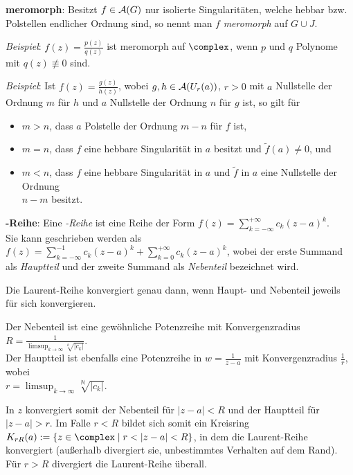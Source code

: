 \textbf{meromorph}:
Besitzt $f \in \mathcal{A}(G)$ nur isolierte Singularitäten, welche hebbar bzw.
Polstellen endlicher Ordnung sind, so nennt man $f$ \emph{meromorph} auf
$G \cup J$.

\emph{Beispiel}:
$f(z) = \frac{p(z)}{q(z)}$ ist meromorph auf $\complex$, wenn
$p$ und $q$ Polynome mit $q(z) \not\equiv 0$ sind.

\emph{Beispiel}:
Ist $f(z) = \frac{g(z)}{h(z)}$, wobei
$g, h \in \mathcal{A}(U_r(a))$, $r > 0$ mit
$a$ Nullstelle der Ordnung $m$ für $h$ und
$a$ Nullstelle der Ordnung $n$ für $g$ ist, so gilt für
\begin{itemize}
    \item
    $m > n$, dass $a$ Polstelle der Ordnung $m - n$ für $f$ ist,

    \item
    $m = n$, dass $f$ eine hebbare Singularität in $a$ besitzt und
    $\widetilde{f}(a) \not= 0$, und

    \item
    $m < n$, dass $f$ eine hebbare Singularität in $a$ und
    $\widetilde{f}$ in $a$ eine Nullstelle der Ordnung\\
    $n - m$ besitzt.
\end{itemize}

\linie

\textbf{-Reihe}:
Eine \emph{-Reihe} ist eine Reihe der Form
$f(z) = \sum_{k=-\infty}^{+\infty} c_k (z - a)^k$.\\
Sie kann geschrieben werden als
$f(z) = \sum_{k=-\infty}^{-1} c_k (z - a)^k +
\sum_{k=0}^{+\infty} c_k (z - a)^k$, wobei
der erste Summand als \emph{Hauptteil} und der zweite Summand als
\emph{Nebenteil} bezeichnet wird.

Die Laurent-Reihe konvergiert genau dann, wenn Haupt- und Nebenteil jeweils
für sich konvergieren.

Der Nebenteil ist eine gewöhnliche Potenzreihe mit Konvergenzradius
$R = \frac{1}{\limsup_{k \to \infty} \sqrt[k]{|c_k|}}$.\\
Der Hauptteil ist ebenfalls eine Potenzreihe in $w = \frac{1}{z - a}$
mit Konvergenzradius $\frac{1}{r}$, wobei\\
$r = \limsup_{k \to \infty} \sqrt[|k|]{|c_k|}$.

In $z$ konvergiert somit der Nebenteil für $|z - a| < R$ und der Hauptteil
für $|z - a| > r$.
Im Falle $r < R$ bildet sich somit ein Kreisring
$K_{rR}(a) := \{z \in \complex \;|\; r < |z - a| < R\}$,
in dem die Laurent-Reihe konvergiert
(außerhalb divergiert sie, unbestimmtes Verhalten auf dem Rand).
Für $r > R$ divergiert die Laurent-Reihe überall.

